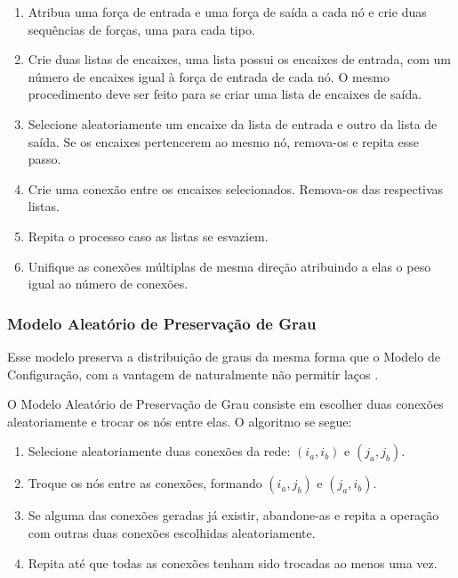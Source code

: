 \documentclass[12pt,a4paper]{article}
\theoremstyle{hypo}
\begin{document}
\begin{enumerate}
\item Atribua uma força de entrada e uma força de saída a cada nó e crie duas sequências de forças, uma para cada tipo.
\item Crie duas listas de encaixes, uma lista possui os encaixes de entrada, com um número de encaixes igual à força de entrada de cada nó. O mesmo procedimento deve ser feito para se criar uma lista de encaixes de saída.
\item Selecione aleatoriamente um encaixe da lista de entrada e outro da lista de saída. Se os encaixes pertencerem ao mesmo nó, remova-os e repita esse passo.
\item Crie uma conexão entre os encaixes selecionados. Remova-os das respectivas listas.
\item Repita o processo caso as listas se esvaziem.
\item Unifique as conexões múltiplas de mesma direção atribuindo a elas o peso igual ao número de conexões.
\end{enumerate}

\subsubsection{Modelo Aleatório de Preservação de Grau} \label{sec:modelo-preservacao-grau}

Esse modelo preserva a distribuição de graus da mesma forma que o Modelo de Configuração, com a vantagem de naturalmente não permitir laços \cite{Barabasi2016-rn}.

O Modelo Aleatório de Preservação de Grau consiste em escolher duas conexões aleatoriamente e trocar os nós entre elas. O algoritmo se segue:

\begin{enumerate}
\item Selecione aleatoriamente duas conexões da rede: $(i_a, i_b)$ e $(j_a, j_b)$.
\item Troque os nós entre as conexões, formando $(i_a, j_b)$ e $(j_a, i_b)$. 
\item Se alguma das conexões geradas já existir, abandone-as e repita a operação com outras duas conexões escolhidas aleatoriamente.
\item Repita até que todas as conexões tenham sido trocadas ao menos uma vez.
\end{enumerate}
\end{document}
